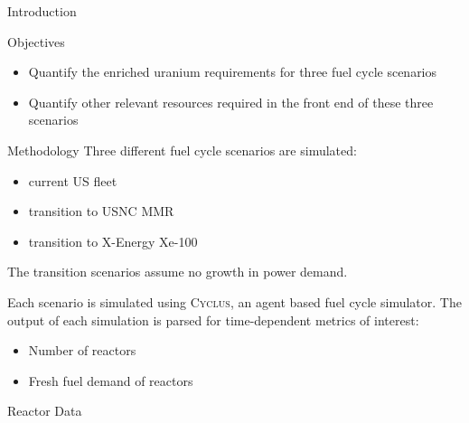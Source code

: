 \documentclass[final]{beamer}
\newlength{\onecolwid}
\newlength{\threecolwid}
\newcommand{\Cyclus}{\textsc{Cyclus}\xspace}%
\begin{document}
\begin{frame}[t]
\begin{columns}[t,totalwidth=\threecolwid]
\begin{column}{\onecolwid}
\begin{block}{Introduction}
\end{block}

\begin{alertblock}{Objectives}
\begin{itemize}
    \item Quantify the enriched uranium requirements for three fuel cycle 
		  scenarios
	\item Quantify other relevant resources required in the front end of 
		  these three scenarios
\end{itemize}

\end{alertblock}

\begin{block}{Methodology}
Three different fuel cycle scenarios are simulated:
  \begin{itemize}
    \item current US fleet
    \item transition to \gls{USNC} \gls{MMR}
    \item transition to X-Energy Xe-100
  \end{itemize}
The transition scenarios assume no growth in power demand.


Each scenario is simulated using \Cyclus \cite{huff_fundamental_2016}, an agent 
based fuel cycle simulator. The output of each simulation is parsed for time-dependent 
metrics of interest:
  \begin{itemize}
    \item Number of reactors
    \item Fresh fuel demand of reactors
  \end{itemize}
\end{block}

\begin{block}{Reactor Data}


\end{block}
\end{column}
\end{columns}
\end{frame}
\end{document}
